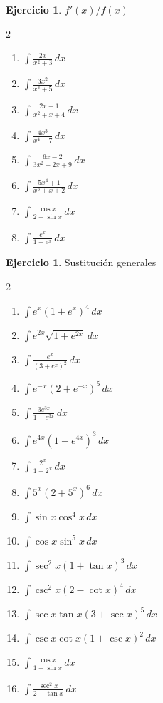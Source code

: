 \documentclass[12pt]{article}
\theoremstyle{definition}
\newtheorem{Ejer}[teorema]{Ejercicio}
\theoremstyle{remark}
\begin{document}
\begin{Ejer}{$f'(x)/f(x)$}
\begin{multicols}{2}
\begin{enumerate}[resume=integrales]
\item $\displaystyle \int\frac{2x}{x^2+3}\,dx$
\item $\displaystyle \int\frac{3x^2}{x^3+5}\,dx$
\item $\displaystyle \int\frac{2x+1}{x^2+x+4}\,dx$
\item $\displaystyle \int\frac{4x^3}{x^4-7}\,dx$
\item $\displaystyle \int\frac{6x-2}{3x^2-2x+9}\,dx$
\item $\displaystyle \int\frac{5x^4+1}{x^5+x+2}\,dx$
\item $\displaystyle \int\frac{\cos x}{2+\sin x}\,dx$
\item $\displaystyle \int\frac{e^x}{1+e^x}\,dx$
\end{enumerate}
\end{multicols}
\end{Ejer}

\begin{Ejer}{Sustitución generales}
\begin{multicols}{2}
\begin{enumerate}[resume=integrales]

\item $\displaystyle \int e^x(1+e^x)^4\,dx$
\item $\displaystyle \int e^{2x}\sqrt{1+e^{2x}}\,dx$
\item $\displaystyle \int\frac{e^x}{(3+e^x)^2}\,dx$
\item $\displaystyle \int e^{-x}(2+e^{-x})^5\,dx$
\item $\displaystyle \int\frac{3e^{3x}}{1+e^{3x}}\,dx$
\item $\displaystyle \int e^{4x}(1-e^{4x})^3\,dx$
\item $\displaystyle \int\frac{2^x}{1+2^x}\,dx$
\item $\displaystyle \int 5^x(2+5^x)^6\,dx$
\item $\displaystyle \int\sin x\cos^4x\,dx$
\item $\displaystyle \int\cos x\sin^5x\,dx$
\item $\displaystyle \int\sec^2x(1+\tan x)^3\,dx$
\item $\displaystyle \int\csc^2x(2-\cot x)^4\,dx$
\item $\displaystyle \int\sec x\tan x(3+\sec x)^5\,dx$
\item $\displaystyle \int\csc x\cot x(1+\csc x)^2\,dx$
\item $\displaystyle \int\frac{\cos x}{1+\sin x}\,dx$
\item $\displaystyle \int\frac{\sec^2x}{2+\tan x}\,dx$
\end{enumerate}
\end{multicols}
\end{Ejer}
\end{document}
